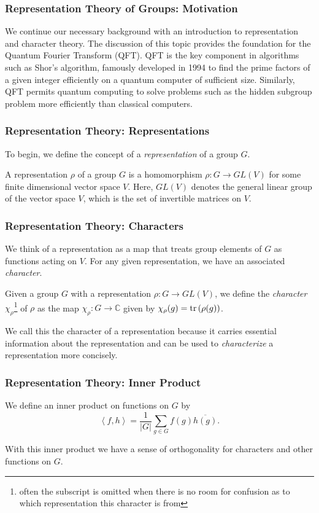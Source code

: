 \documentclass{beamer}
\newcommand{\abs}[1]{\left\lvert #1 \right\rvert}
\newcommand{\inner}[2]{\left\langle #1, #2 \right\rangle}
\newcommand{\tr}[1]{\textnormal{tr}\left(#1\right)}
\newcommand{\conj}[1]{\overline{#1}}
\newcommand{\bb}[1]{\mathbb{#1}}
\begin{document}
\begin{frame}
\frametitle{Representation Theory of Groups: Motivation}\label{history:representation_theory}
        We continue our necessary background with an introduction to representation and character theory.
        The discussion of this topic provides the foundation for the Quantum Fourier Transform (QFT).
        QFT is the key component in algorithms such as Shor's algorithm, famously developed in 1994 to find the prime factors of a given integer efficiently on a quantum computer of sufficient size.
        Similarly, QFT permits quantum computing to solve problems such as the hidden subgroup problem more efficiently than classical computers.
\end{frame}

\begin{frame}
\frametitle{Representation Theory: Representations}
        To begin, we define the concept of a \textit{representation} of a group $G$.
        \begin{definition}[Representation]\label{def:representation}
            A representation $\rho$ of a group $G$ is a homomorphism $\rho : G \to GL(V)$ for some finite dimensional vector space $V$. 
            Here, $GL(V)$ denotes the general linear group of the vector space $V$, which is the set of invertible matrices on $V$.
        \end{definition}
\end{frame}

\begin{frame}
\frametitle{Representation Theory: Characters}
        We think of a representation as a map that treats group elements of $G$ as functions acting on $V$.
        For any given representation, we have an associated \textit{character}.
        \begin{definition}[Character]\label{def:character}
            Given a group $G$ with a representation $\rho: G \to GL(V)$, we define the \textit{character} $\chi_\rho$\footnote{often the subscript is omitted when there is no room for confusion as to which representation this character is from} of $\rho$ as the map $\chi_\rho: G \to \bb{C}$ given by $\chi_\rho (g) = \tr{\rho(g)}$.
        \end{definition}
        We call this the character of a representation because it carries essential information about the representation and can be used to \textit{characterize} a representation more concisely.
\end{frame}

\begin{frame}
\frametitle{Representation Theory: Inner Product}
        We define an inner product on functions on $G$ by
        \begin{equation}\label{def:character_inner_product}
            \inner{f}{h} = \frac{1}{\abs{G}}\sum_{g \in G} f(g) \conj{h(g)}.
        \end{equation}

        With this inner product we have a sense of orthogonality for characters and other functions on $G$.
\end{frame}
\end{document}
